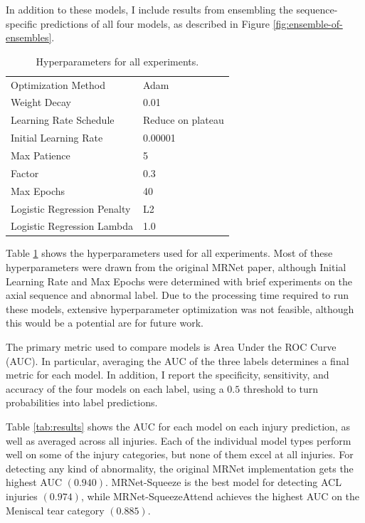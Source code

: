 \documentclass[10pt,twocolumn,letterpaper]{article}
\begin{document}
In addition to these models, I include results from ensembling the sequence-specific predictions of all four models, as described in Figure \ref{fig:ensemble-of-ensembles}.

\begin{table}
\begin{center}
\begin{tabular}{|l|l|}
\hline
Optimization Method & Adam \\
Weight Decay & 0.01 \\
\hline
Learning Rate Schedule & Reduce on plateau \\
Initial Learning Rate & 0.00001 \\
Max Patience & 5 \\
Factor & 0.3 \\
\hline
Max Epochs & 40 \\
\hline
Logistic Regression Penalty & L2 \\
Logistic Regression Lambda & 1.0 \\
\hline

\end{tabular}
\end{center}
\caption{Hyperparameters for all experiments.}
\label{tab:hyperparams}
\end{table}

Table \ref{tab:hyperparams} shows the hyperparameters used for all experiments. Most of these hyperparameters were drawn from the original MRNet paper, although Initial Learning Rate and Max Epochs were determined with brief experiments on the axial sequence and abnormal label. Due to the processing time required to run these models, extensive hyperparameter optimization was not feasible, although this would be a potential are for future work.

The primary metric used to compare models is Area Under the ROC Curve (AUC). In particular, averaging the AUC of the three labels determines a final metric for each model. In addition, I report the specificity, sensitivity, and accuracy of the four models on each label, using a $0.5$ threshold to turn probabilities into label predictions.

Table \ref{tab:results} shows the AUC for each model on each injury prediction, as well as averaged across all injuries. Each of the individual model types perform well on some of the injury categories, but none of them excel at all injuries. For detecting any kind of abnormality, the original MRNet implementation gets the highest AUC $(0.940)$. MRNet-Squeeze is the best model for detecting ACL injuries $(0.974)$, while MRNet-SqueezeAttend achieves the highest AUC on the Meniscal tear category $(0.885)$.
\end{document}
